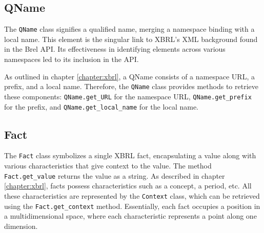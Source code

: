 \subsection{QName}
\label{subsec:qname}

The \texttt{QName} class signifies a qualified name, merging a namespace binding with a local name.  
This element is the singular link to XBRL's XML background found in the Brel API.  
Its effectiveness in identifying elements across various namespaces led to its inclusion in the API.  

As outlined in chapter \ref{chapter:xbrl}, a QName consists of a namespace URL, a prefix, and a local name.  
Therefore, the \texttt{QName} class provides methods to retrieve these components:  
\texttt{QName.get\_URL} for the namespace URL, \texttt{QName.get\_prefix} for the prefix, and \texttt{QName.get\_local\_name} for the local name.

\subsection{Fact}
\label{subsec:fact}

The \texttt{Fact} class symbolizes a single XBRL fact, encapsulating a value along with various characteristics that give context to the value.
The method \texttt{Fact.get\_value} returns the value as a string.
As described in chapter \ref{chapter:xbrl}, facts possess characteristics such as a concept, a period, etc.
All these characteristics are represented by the \texttt{Context} class, 
which can be retrieved using the \texttt{Fact.get\_context} method.
Essentially, each fact occupies a position in a multidimensional space, where each characteristic represents a point along one dimension.

